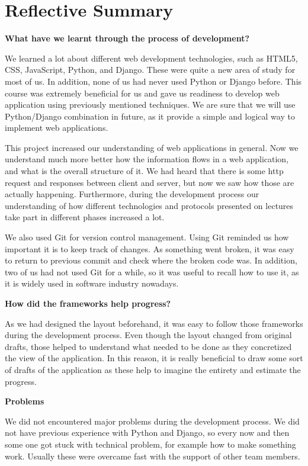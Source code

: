 \documentclass{sig-alt-release2}
\begin{document}
\section{Reflective Summary}

\textbf{What have we learnt through the process of development?}

We learned a lot about different web development technologies, such as HTML5, CSS, JavaScript, Python, and Django. These were quite a new area of study for most of us. In addition, none of us had never used Python or Django before. This course was extremely beneficial for us and gave us readiness to develop web application using previously mentioned techniques. We are sure that we will use Python/Django combination in future, as it provide a simple and logical way to implement web applications. 

This project increased our understanding of web applications in general. Now we understand much more better how the information flows in a web application, and what is the overall structure of it. We had heard that there is some http request and responses between client and server, but now we saw how those are actually happening. Furthermore, during the development process our understanding of how different technologies and protocols presented on lectures take part in different phases increased a lot.

We also used Git for version control management. Using Git reminded us how important it is to keep track of changes. As something went broken, it was easy to return to previous commit and check where the broken code was. In addition, two of us had not used Git for a while, so it was useful to recall how to use it, as it is widely used in software industry nowadays. 

\textbf{How did the frameworks help progress?}

As we had designed the layout beforehand, it was easy to follow those frameworks during the development process. Even though the layout changed from original drafts, those helped to understand what needed to be done as they concretized the view of the application. In this reason, it is really beneficial to draw some sort of drafts of the application as these help to imagine the entirety and estimate the progress.

\textbf{Problems}

We did not encountered major problems during the development process. We did not have previous experience with Python and Django, so every now and then some one got stuck with technical problem, for example how to make something work. Usually these were overcame fast with the support of other team members.
\end{document}
